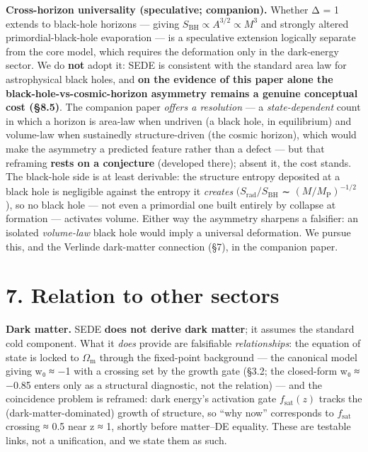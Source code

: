 \documentclass[
  10pt,
]{article}
\begin{document}
\textbf{Cross-horizon universality (speculative; companion).} Whether Δ
= 1 extends to black-hole horizons --- giving
\(S_{\mathrm{BH}} \propto  A^{3/2} \propto  M^{3}\) and strongly altered
primordial-black-hole evaporation --- is a speculative extension
logically separate from the core model, which requires the deformation
only in the dark-energy sector. We do \textbf{not} adopt it: SEDE is
consistent with the standard area law for astrophysical black holes, and
\textbf{on the evidence of this paper alone the
black-hole-vs-cosmic-horizon asymmetry remains a genuine conceptual cost
(§8.5)}. The companion paper \emph{offers a resolution} --- a
\emph{state-dependent} count in which a horizon is area-law when
undriven (a black hole, in equilibrium) and volume-law when sustainedly
structure-driven (the cosmic horizon), which would make the asymmetry a
predicted feature rather than a defect --- but that reframing
\textbf{rests on a conjecture} (developed there); absent it, the cost
stands. The black-hole side is at least derivable: the structure entropy
deposited at a black hole is negligible against the entropy it
\emph{creates} \((S_{\mathrm{rad}}/S_{\mathrm{BH}}\) ∼
\((M/M_{\mathrm{P}})^{-1/2}\)), so no black hole --- not even a
primordial one built entirely by collapse at formation --- activates
volume. Either way the asymmetry sharpens a falsifier: an isolated
\emph{volume-law} black hole would imply a universal deformation. We
pursue this, and the Verlinde dark-matter connection (§7), in the
companion paper.

\section{7. Relation to other sectors}\label{relation-to-other-sectors}

\textbf{Dark matter.} SEDE \textbf{does not derive dark matter}; it
assumes the standard cold component. What it \emph{does} provide are
falsifiable \emph{relationships}: the equation of state is locked to
\(\Omega _{\mathrm{m}}\) through the fixed-point background --- the
canonical model giving w₀ ≈ −1 with a crossing set by the growth gate
(§3.2; the closed-form w₀ ≈ −0.85 enters only as a structural
diagnostic, not the relation) --- and the coincidence problem is
reframed: dark energy's activation gate \(f_{\mathrm{sat}}(z)\) tracks
the (dark-matter-dominated) growth of structure, so ``why now''
corresponds to \(f_{\mathrm{sat}}\) crossing ≈ 0.5 near z ≈ 1, shortly
before matter--DE equality. These are testable links, not a unification,
and we state them as such.
\end{document}
